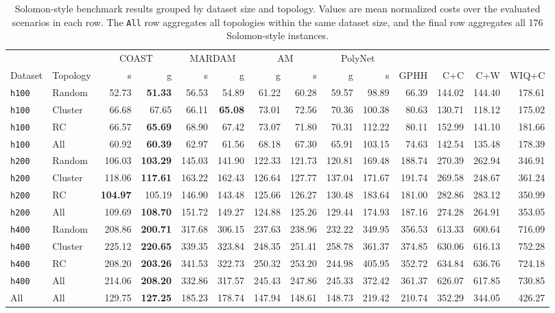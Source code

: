 \documentclass[letterpaper]{article}
\begin{document}
\begin{table}[t]
\centering
{\small
\setlength{\tabcolsep}{1.5pt}
\begin{tabular}{llrrrrrrrrrrrr}
\toprule
& & \multicolumn{2}{c}{COAST} & \multicolumn{2}{c}{MARDAM} & \multicolumn{2}{c}{AM} & \multicolumn{2}{c}{PolyNet} & & & & \\
Dataset & Topology & s & g & s & g & g & s & g & s & GPHH & C+C & C+W & WIQ+C \\
\midrule
\texttt{h100} & Random & 52.73 & \textbf{51.33} & 56.53 & 54.89 & 61.22 & 60.28 & 59.57 & 98.89 & 66.39 & 144.02 & 144.40 & 178.61 \\
\texttt{h100} & Cluster & 66.68 & 67.65 & 66.11 & \textbf{65.08} & 73.01 & 72.56 & 70.36 & 100.38 & 80.63 & 130.71 & 118.12 & 175.02 \\
\texttt{h100} & RC & 66.57 & \textbf{65.69} & 68.90 & 67.42 & 73.07 & 71.80 & 70.31 & 112.22 & 80.11 & 152.99 & 141.10 & 181.66 \\
\texttt{h100} & All & 60.92 & \textbf{60.39} & 62.97 & 61.56 & 68.18 & 67.30 & 65.91 & 103.15 & 74.63 & 142.54 & 135.48 & 178.39 \\
\midrule
\texttt{h200} & Random & 106.03 & \textbf{103.29} & 145.03 & 141.90 & 122.33 & 121.73 & 120.81 & 169.48 & 188.74 & 270.39 & 262.94 & 346.91 \\
\texttt{h200} & Cluster & 118.06 & \textbf{117.61} & 163.22 & 162.43 & 126.64 & 127.77 & 137.04 & 171.67 & 191.74 & 269.58 & 248.67 & 361.24 \\
\texttt{h200} & RC & \textbf{104.97} & 105.19 & 146.90 & 143.48 & 125.66 & 126.27 & 130.48 & 183.64 & 181.00 & 282.86 & 283.12 & 350.99 \\
\texttt{h200} & All & 109.69 & \textbf{108.70} & 151.72 & 149.27 & 124.88 & 125.26 & 129.44 & 174.93 & 187.16 & 274.28 & 264.91 & 353.05 \\
\midrule
\texttt{h400} & Random & 208.86 & \textbf{200.71} & 317.68 & 306.15 & 237.63 & 238.96 & 232.22 & 349.95 & 356.53 & 613.33 & 600.64 & 716.09 \\
\texttt{h400} & Cluster & 225.12 & \textbf{220.65} & 339.35 & 323.84 & 248.35 & 251.41 & 258.78 & 361.37 & 374.85 & 630.06 & 616.13 & 752.28 \\
\texttt{h400} & RC & 208.20 & \textbf{203.26} & 341.53 & 322.73 & 250.32 & 253.20 & 244.98 & 405.95 & 352.72 & 634.84 & 636.76 & 724.18 \\
\texttt{h400} & All & 214.06 & \textbf{208.20} & 332.86 & 317.57 & 245.43 & 247.86 & 245.33 & 372.42 & 361.37 & 626.07 & 617.85 & 730.85 \\
\midrule
All & All & 129.75 & \textbf{127.25} & 185.23 & 178.74 & 147.94 & 148.61 & 148.73 & 219.42 & 210.74 & 352.29 & 344.05 & 426.27 \\
\bottomrule
\end{tabular}
}
\caption{Solomon-style benchmark results grouped by dataset size and topology. Values are mean normalized costs over the evaluated scenarios in each row. The \texttt{All} row aggregates all topologies within the same dataset size, and the final row aggregates all 176 Solomon-style instances.}
\label{tab:solomon_benchmark}
\end{table}
\end{document}

